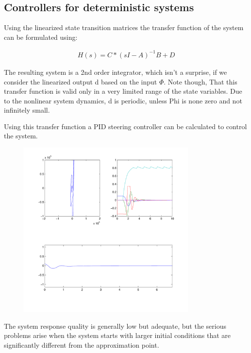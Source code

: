 \subsection{Controllers for deterministic systems}

Using the linearized state transition matrices the transfer function of the system can be formulated using:

\begin{align}
	H(s) = C*(sI - A)^{-1}B + D
\end{align}

The resulting system is a 2nd order integrator, which isn’t a surprise, if we consider the linearized output d based on the input $\Phi$. Note though, That this transfer function is valid only in a very limited range of the state variables. Due to the nonlinear system dynamics, d is periodic, unless Phi is none zero and not infinitely small.

Using this transfer function a PID steering controller can be calculated to control the system.

\begin{figure}[H]
	\centering
	\includegraphics[width=0.8\textwidth]{img2/PI01}
	\caption{}
	\label{}
\end{figure}

The system response quality is generally low but adequate, but the serious problems arise when the system starts with larger initial conditions that are significantly different from the approximation point.

